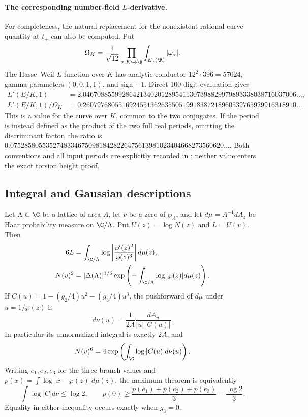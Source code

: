 \paragraph{The corresponding number-field $L$-derivative.}
For completeness, the natural replacement for the nonexistent
rational-curve quantity at $t_\pm$ can also be computed. Put
\[
 \Omega_K=\frac1{\sqrt{12}}
  \prod_{\sigma:K\hookrightarrow\R}
       \int_{E_\sigma(\R)}|\omega_\sigma|.
\]
The Hasse--Weil $L$-function over $K$ has analytic conductor
$12^2\cdot396=57024$, gamma parameters $(0,0,1,1)$, and sign
$-1$. Direct 100-digit evaluation gives
\begin{align*}
 L'(E/K,1)&=2.046708855992864213402012895411307398829979893338038716037006\ldots,\\
 L'(E/K,1)/\Omega_K
 &=0.260797680551692455136263550519918387218960539765929916318910\ldots.
\end{align*}
This is a value for the curve over $K$, common to the two
conjugates. If the period is instead defined as the product of
the two full real periods, omitting the discriminant factor,
the ratio is
$0.075285805535274833467509818428226475613981023404668273560620\ldots$.
Both conventions and all input periods are explicitly recorded
in ; neither value enters
the exact torsion height proof.



\subsection{Integral and Gaussian descriptions}

\begin{proposition}\label{ari:C.8.6}
Let $\Lambda\subset\C$ be a lattice of area $A$, let $v$ be a zero
of $\wp_\Lambda$, and let $d\mu=A^{-1}dA_z$ be Haar probability
measure on $\C/\Lambda$. Put $U(z)=\log N(z)$ and
$L=U(v)$. Then
\begin{align}
 6L&=\int_{\C/\Lambda}\log\left|\frac{\wp'(z)^2}{\wp(z)^3}\right|d\mu(z),
 \label{ari:eq:ca-mahler}\\
 N(v)^2&=|\Delta(\Lambda)|^{1/6}
      \exp\left(-\int_{\C/\Lambda}\log|\wp(z)|d\mu(z)\right).
 \label{ari:eq:ca-wpmean}
\end{align}
If $C(u)=1-(g_2/4)u^2-(g_3/4)u^3$, the pushforward of $d\mu$
under $u=1/\wp(z)$ is
\begin{equation}\label{ari:eq:ca-nu}
 d\nu(u)=\frac1{2A}\frac{dA_u}{|u|\,|C(u)|}.
\end{equation}
In particular its unnormalized integral is exactly $2A$, and
\[
 N(v)^6=4\exp\left(\int_{\C}\log|C(u)|d\nu(u)\right).
\]
Writing $e_1,e_2,e_3$ for the three branch values and
$p(x)=\int\log|x-\wp(z)|d\mu(z)$, the maximum theorem is equivalently
\[
 \int\log|C|d\nu\leq\log2,\qquad
 p(0)\geq\frac{p(e_1)+p(e_2)+p(e_3)}3-\frac{\log2}3.
\]
Equality in either inequality occurs exactly when $g_3=0$.
\end{proposition}

